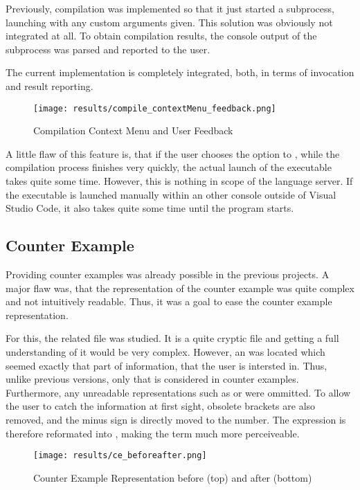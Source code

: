 Previously, compilation was implemented so that it just started a subprocess, launching  with any custom arguments given.
This solution was obviously not integrated at all.
To obtain compilation results, the console output of the subprocess was parsed and reported to the user.

The current implementation is completely integrated, both, in terms of invocation and result reporting.

\begin{figure}[h]
    \centering
    \texttt{[image: results/compile\_contextMenu\_feedback.png]}
    \caption{Compilation Context Menu and User Feedback}
    \label{fig:compilation_stuff}
\end{figure}


A little flaw of this feature is, that if the user chooses the option to , while the compilation process finishes very quickly, the actual launch of the executable takes quite some time.
However, this is nothing in scope of the language server.
If the executable is launched manually within an other console outside of Visual Studio Code, it also takes quite some time until the program starts.

\subsection{Counter Example}
Providing counter examples was already possible in the previous projects.
A major flaw was, that the representation of the counter example was quite complex and not intuitively readable.
Thus, it was a goal to ease the counter example representation.

For this, the related  file was studied.
It is a quite cryptic file and getting a full understanding of it would be very complex.
However, an  was located which seemed exactly that part of information, that the user is intersted in.
Thus, unlike previous versions, only that  is considered in counter examples.
Furthermore, any unreadable representations such as  or  were ommitted.
To allow the user to catch the information at first sight, obsolete brackets are also removed, and the minus sign is directly moved to the number.
The expression  is therefore reformated into , making the term much more perceiveable.

\begin{figure}[h]
    \centering
    \texttt{[image: results/ce\_beforeafter.png]}
    \caption{Counter Example Representation before (top) and after (bottom)}
    \label{fig:ce_beforeafter}
\end{figure}

